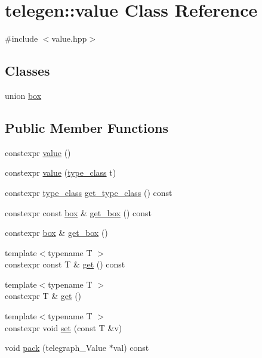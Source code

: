 \hypertarget{classtelegen_1_1value}{}\section{telegen\+:\+:value Class Reference}
\label{classtelegen_1_1value}


{\ttfamily \#include $<$value.\+hpp$>$}

\subsection*{Classes}
\begin{DoxyCompactItemize}
\item 
union \hyperlink{uniontelegen_1_1value_1_1box}{box}
\end{DoxyCompactItemize}
\subsection*{Public Member Functions}
\begin{DoxyCompactItemize}
\item 
constexpr \hyperlink{classtelegen_1_1value_aa2c76dda3f9812dd9a031a0b463a6f5c}{value} ()
\item 
constexpr \hyperlink{classtelegen_1_1value_a7e501fb7a6f3b724255b88572a76d073}{value} (\hyperlink{namespacetelegen_a72d4e69f0be1731e1a851a96dec858d8}{type\+\_\+class} t)
\item 
constexpr \hyperlink{namespacetelegen_a72d4e69f0be1731e1a851a96dec858d8}{type\+\_\+class} \hyperlink{classtelegen_1_1value_a792839f18c1e787e369d3362f022362c}{get\+\_\+type\+\_\+class} () const
\item 
constexpr const \hyperlink{uniontelegen_1_1value_1_1box}{box} \& \hyperlink{classtelegen_1_1value_a28195c2d95fc3d7c61bcc32cb4f64d66}{get\+\_\+box} () const
\item 
constexpr \hyperlink{uniontelegen_1_1value_1_1box}{box} \& \hyperlink{classtelegen_1_1value_a81c1fb26319a11335d1745fc2d01e36b}{get\+\_\+box} ()
\item 
{\footnotesize template$<$typename T $>$ }\\constexpr const T \& \hyperlink{classtelegen_1_1value_a4bcd8e8317c0395b523596e4c0fa180d}{get} () const
\item 
{\footnotesize template$<$typename T $>$ }\\constexpr T \& \hyperlink{classtelegen_1_1value_af3cd1843daaccaadcdf2a526147c485e}{get} ()
\item 
{\footnotesize template$<$typename T $>$ }\\constexpr void \hyperlink{classtelegen_1_1value_a801da4870cd04e737db817d10fe6780c}{set} (const T \&v)
\item 
void \hyperlink{classtelegen_1_1value_a9bba0ce74da6b87a86dac99d0e5efa0c}{pack} (telegraph\+\_\+\+Value $\ast$val) const
\end{DoxyCompactItemize}


